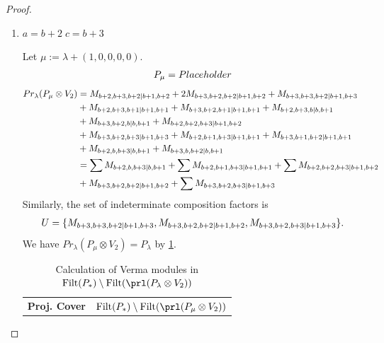 \begin{proof}
\begin{enumerate}
\begin{enumerate}
\begin{enumerate}
          \item $ a = b+2 \; c=b+3 $\par
        Let $\mu:=\lambda + (1,0,0,0,0) $.
        \begin{equation}\notag
          \begin{aligned}
            P_\mu = Placeholder
          \end{aligned}
        \end{equation}
        \begin{equation}\notag
          \begin{aligned}
            Pr_{\lambda}(P_\mu \otimes V_{2}) &=
M_{b+2,b+3,b+2|b+1,b+2}
+ 2M_{b+3,b+2,b+2|b+1,b+2}
+ M_{b+3,b+3,b+2|b+1,b+3}\\
                                               &
+ M_{b+2,b+3,b+1|b+1,b+1}
+ M_{b+3,b+2,b+1|b+1,b+1}
+ M_{b+2,b+3,b|b,b+1}\\
                                               &
+ M_{b+3,b+2,b|b,b+1}
+ M_{b+2,b+2,b+3|b+1,b+2}\\
                                               &
+ M_{b+3,b+2,b+3|b+1,b+3}
+ M_{b+2,b+1,b+3|b+1,b+1}
+ M_{b+3,b+1,b+2|b+1,b+1}\\
                                               &
+ M_{b+2,b,b+3|b,b+1}
+ M_{b+3,b,b+2|b,b+1} \\
                                               &=
\sum M_{b+2,b,b+3|b,b+1}
+ \sum M_{b+2,b+1,b+3|b+1,b+1}
+ \sum M_{b+2,b+2,b+3|b+1,b+2}\\
                                               &
+  M_{b+3,b+2,b+2|b+1,b+2}
+ \sum M_{b+3,b+2,b+3|b+1,b+3}
          \end{aligned}
        \end{equation}
      Similarly, the set of indeterminate composition factors is 
\begin{equation}\notag
  \begin{aligned}
    U = \{
M_{b+3,b+3,b+2|b+1,b+3},
M_{b+3,b+2,b+2|b+1,b+2},
M_{b+3,b+2,b+3|b+1,b+3}
\}.
  \end{aligned}
\end{equation}
       We have $Pr_{\lambda}(P_\mu \otimes V_{2}) = P_\lambda  $ by \cref{tab:verma-analysis_1_a_13}.
\begin{table}[htbp]
\centering
\caption{Calculation of Verma modules in $\operatorname{Filt}(P_*) \setminus \operatorname{Filt}(\prl(P_\lambda \otimes V_{2})) $ } \label{tab:verma-analysis_1_a_13}
\begin{tabular}{cc}
\toprule
\textbf{Proj. Cover} & \textbf{$\operatorname{Filt}(P_*) \setminus \operatorname{Filt}(\prl(P_\mu \otimes V_{2})) $}  \\

\end{tabular}
\end{table}
\end{enumerate}
\end{enumerate}
\end{enumerate}
\end{proof}
